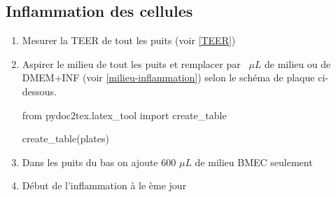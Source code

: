 \subsection{Inflammation des cellules}

\begin{enumerate}
\item Mesurer la TEER de tout les puits (voir \ref{TEER})
\item Aspirer le milieu de tout les puits et remplacer par ~$\mu L$ de milieu ou de DMEM+INF (voir \ref{milieu-inflammation}) selon le schéma de plaque ci-dessous.

\begin{pycode}
from pydoc2tex.latex_tool import create_table

create_table(plates)
\end{pycode}

\item Dans les puits du bas on ajoute 600 $\mu L$ de milieu BMEC seulement
\item Début de l'inflammation à  le  ème jour
\end{enumerate}


